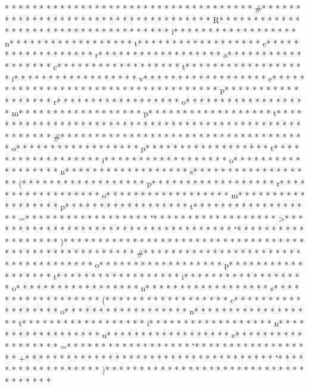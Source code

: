 * * *  * * *  * * *  *  * * *  *  * * *  *  * * *  * * *  * * *  *  * * *  *  * * *  * #* * *  * * *  * * *  *  * * *  *  * * *  *  * * *  * * *  * * *  *  * * *  *  * * *  * R* * *  * * *  * * *  *  * * *  *  * * *  *  * * *  * * *  * * *  *  * * *  *  * * *  * i* * *  * * *  * * *  *  * * *  *  * * *  * n* * *  * * *  * * *  *  * * *  *  * * *  * t* * *  * * *  * * *  *  * * *  *  * * *  * e* * *  * * *  * * *  *  * * *  *  * * *  * r* * *  * * *  * * *  *  * * *  *  * * *  * a* * *  * * *  * * *  *  * * *  *  * * *  * c* * *  * * *  * * *  *  * * *  *  * * *  * t* * *  * * *  * * *  *  * * *  *  * * *  * i* * *  * * *  * * *  *  * * *  *  * * *  * v* * *  * * *  * * *  *  * * *  *  * * *  * e* * *  * * *  * * *  *  * * *  *  * * *  *  * * *  * * *  * * *  *  * * *  *  * * *  * p* * *  * * *  * * *  *  * * *  *  * * *  * r* * *  * * *  * * *  *  * * *  *  * * *  * o* * *  * * *  * * *  *  * * *  *  * * *  * m* * *  * * *  * * *  *  * * *  *  * * *  * p* * *  * * *  * * *  *  * * *  *  * * *  * t* * *  * * *  * * *  *  * * *  *  * * *  *  * * *  * * *  * * *  *  * * *  *  * * *  * 
* * *  * * *  * * *  *  * * *  *  * * *  * #* * *  * * *  * * *  *  * * *  *  * * *  *  * * *  * * *  * * *  *  * * *  *  * * *  * o* * *  * * *  * * *  *  * * *  *  * * *  * p* * *  * * *  * * *  *  * * *  *  * * *  * t* * *  * * *  * * *  *  * * *  *  * * *  * i* * *  * * *  * * *  *  * * *  *  * * *  * o* * *  * * *  * * *  *  * * *  *  * * *  * n* * *  * * *  * * *  *  * * *  *  * * *  * s* * *  * * *  * * *  *  * * *  *  * * *  * (* * *  * * *  * * *  *  * * *  *  * * *  * p* * *  * * *  * * *  *  * * *  *  * * *  * r* * *  * * *  * * *  *  * * *  *  * * *  * o* * *  * * *  * * *  *  * * *  *  * * *  * m* * *  * * *  * * *  *  * * *  *  * * *  * p* * *  * * *  * * *  *  * * *  *  * * *  * t* * *  * * *  * * *  *  * * *  *  * * *  * =* * *  * * *  * * *  *  * * *  *  * * *  * "* * *  * * *  * * *  *  * * *  *  * * *  * >* * *  * * *  * * *  *  * * *  *  * * *  *  * * *  * * *  * * *  *  * * *  *  * * *  * "* * *  * * *  * * *  *  * * *  *  * * *  * )* * *  * * *  * * *  *  * * *  *  * * *  * 
* * *  * * *  * * *  *  * * *  *  * * *  *  * * *  * * *  * * *  *  * * *  *  * * *  * #* * *  * * *  * * *  *  * * *  *  * * *  *  * * *  * * *  * * *  *  * * *  *  * * *  * o* * *  * * *  * * *  *  * * *  *  * * *  * p* * *  * * *  * * *  *  * * *  *  * * *  * t* * *  * * *  * * *  *  * * *  *  * * *  * i* * *  * * *  * * *  *  * * *  *  * * *  * o* * *  * * *  * * *  *  * * *  *  * * *  * n* * *  * * *  * * *  *  * * *  *  * * *  * s* * *  * * *  * * *  *  * * *  *  * * *  * (* * *  * * *  * * *  *  * * *  *  * * *  * c* * *  * * *  * * *  *  * * *  *  * * *  * o* * *  * * *  * * *  *  * * *  *  * * *  * n* * *  * * *  * * *  *  * * *  *  * * *  * t* * *  * * *  * * *  *  * * *  *  * * *  * i* * *  * * *  * * *  *  * * *  *  * * *  * n* * *  * * *  * * *  *  * * *  *  * * *  * u* * *  * * *  * * *  *  * * *  *  * * *  * e* * *  * * *  * * *  *  * * *  *  * * *  * =* * *  * * *  * * *  *  * * *  *  * * *  * "* * *  * * *  * * *  *  * * *  *  * * *  * +* * *  * * *  * * *  *  * * *  *  * * *  *  * * *  * * *  * * *  *  * * *  *  * * *  * "* * *  * * *  * * *  *  * * *  *  * * *  * )* * *  * * *  * * *  *  * * *  *  * * *  *  * * *  * * *  * * *  *  * * *  *  * * *  * 
